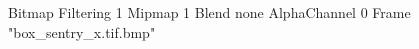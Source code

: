 {Bitmap
	{Filtering 1}
	{Mipmap 1}
	{Blend none}
	{AlphaChannel 0}
	{Frame "box_sentry_x.tif.bmp"}
}
